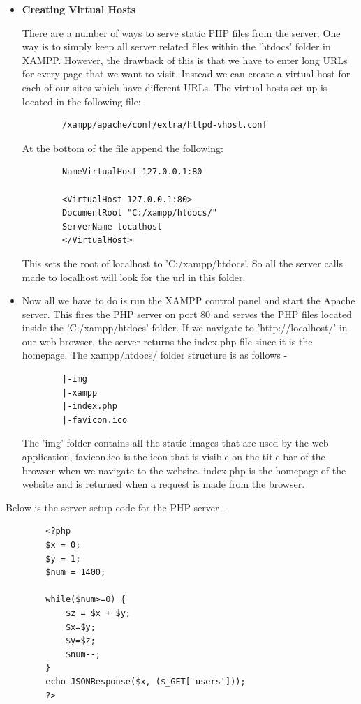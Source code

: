 \documentclass[../thesis.tex]{subfiles}
\begin{document}
	\begin{itemize}
		\item \textbf{Creating Virtual Hosts}
		\newline

		There are a number of ways to serve static PHP files from the server. One way is to simply keep all server related files within the 'htdocs' folder in XAMPP. However, the drawback of this is that we have to enter long URLs for every page that we want to visit. Instead we can create a virtual host for each of our sites which have different URLs. The virtual hosts set up is located in the following file: 
		\begin{verbatim}
		/xampp/apache/conf/extra/httpd-vhost.conf
		\end{verbatim}
		At the bottom of the file append the following:
		\begin{verbatim}
		NameVirtualHost 127.0.0.1:80
		
		<VirtualHost 127.0.0.1:80>
		DocumentRoot "C:/xampp/htdocs/"
		ServerName localhost
		</VirtualHost>
		\end{verbatim}
		This sets the root of localhost to 'C:/xampp/htdocs'. So all the server calls made to localhost will look for the url in this folder. 
		\smallskip
		\item Now all we have to do is run the XAMPP control panel and start the Apache server. This fires the PHP server on port 80 and serves the PHP files located inside the 'C:/xampp/htdocs' folder. If we navigate to 'http://localhost/' in our web browser, the server returns the index.php file since it is the homepage. The xampp/htdocs/ folder structure is as follows - 
		\begin{verbatim}
		|-img
		|-xampp
		|-index.php
		|-favicon.ico
		\end{verbatim}
		The 'img' folder contains all the static images that are used by the web application, favicon.ico is the icon that is visible on the title bar of the browser when we navigate to the website. index.php is the homepage of the website and is returned when a request is made from the browser.
	\end{itemize}
	Below is the server setup code for the PHP server - 
	\begin{Verbatim}
		<?php
		$x = 0;    
		$y = 1;
		$num = 1400; 
		
		while($num>=0) {    
			$z = $x + $y;         
			$x=$y;       
			$y=$z;
			$num--;
		} 
		echo JSONResponse($x, ($_GET['users']));
		?>
	\end{Verbatim}
\end{document}
